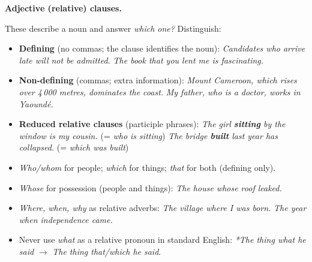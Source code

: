 \documentclass[11pt]{article}
\begin{document}
\textbf{Adjective (relative) clauses.}\par
These describe a noun and answer \emph{which one?} Distinguish:
\begin{itemize}
\item \textbf{Defining} (no commas; the clause identifies the noun): \emph{Candidates who arrive late will not be admitted.} \emph{The book that you lent me is fascinating.}
\item \textbf{Non-defining} (commas; extra information): \emph{Mount Cameroon, which rises over 4\,000 metres, dominates the coast.} \emph{My father, who is a doctor, works in Yaoundé.}
\item \textbf{Reduced relative clauses} (participle phrases): \emph{The girl \textbf{sitting} by the window is my cousin.} (= \emph{who is sitting}) \emph{The bridge \textbf{built} last year has collapsed.} (= \emph{which was built})
\end{itemize}

\begin{attention}
\begin{itemize}
\item \emph{Who/whom} for people; \emph{which} for things; \emph{that} for both (defining only).
\item \emph{Whose} for possession (people and things): \emph{The house whose roof leaked.}
\item \emph{Where, when, why} as relative adverbs: \emph{The village where I was born.} \emph{The year when independence came.}
\item Never use \emph{what} as a relative pronoun in standard English: \emph{*The thing what he said} $\rightarrow$ \emph{The thing that/which he said}.
\end{itemize}
\end{attention}
\end{document}
